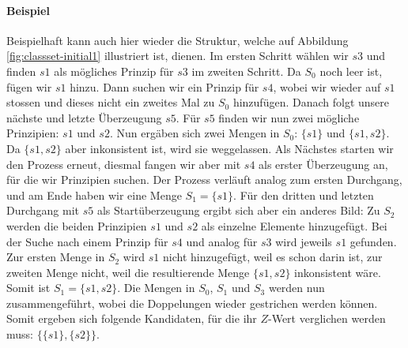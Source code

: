 \documentclass{article}
\begin{document}
\paragraph{Beispiel}
Beispielhaft kann auch hier wieder die Struktur, welche auf Abbildung \ref{fig:classset-initial1} illustriert ist, dienen. Im ersten Schritt wählen wir $s3$ und finden $s1$ als mögliches Prinzip für $s3$ im zweiten Schritt. Da $S_0$ noch leer ist, fügen wir $s1$ hinzu. Dann suchen wir ein Prinzip für $s4$, wobei wir wieder auf $s1$ stossen und dieses nicht ein zweites Mal zu $S_0$ hinzufügen. Danach folgt unsere nächste und letzte Überzeugung $s5$. Für $s5$ finden wir nun zwei mögliche Prinzipien: $s1$ und $s2$. Nun ergäben sich zwei Mengen in $S_0$: $\{s1\}$ und $\{s1, s2\}$. Da $\{s1, s2\}$ aber inkonsistent ist, wird sie weggelassen. Als Nächstes starten wir den Prozess erneut, diesmal fangen wir aber mit $s4$ als erster Überzeugung an, für die wir Prinzipien suchen. Der Prozess verläuft analog zum ersten Durchgang, und am Ende haben wir eine Menge $S_1 = \{s1\}$. Für den dritten und letzten Durchgang mit $s5$ als Startüberzeugung ergibt sich aber ein anderes Bild: Zu $S_2$ werden die beiden Prinzipien $s1$ und $s2$ als einzelne Elemente hinzugefügt. Bei der Suche nach einem Prinzip für $s4$ und analog für $s3$ wird jeweils $s1$ gefunden. Zur ersten Menge in $S_2$ wird $s1$ nicht hinzugefügt, weil es schon darin ist, zur zweiten Menge nicht, weil die resultierende Menge $\{s1,s2\}$ inkonsistent wäre. Somit ist $S_1 = \{{s1}, {s2}\}$. Die Mengen in $S_0$, $S_1$ und $S_3$ werden nun zusammengeführt, wobei die Doppelungen wieder gestrichen werden können. Somit ergeben sich folgende Kandidaten, für die ihr $Z$-Wert verglichen werden muss: $\{\{s1\}, \{s2\}\}$.
\end{document}
